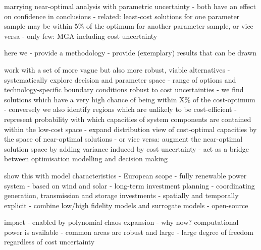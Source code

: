 
marrying near-optimal analysis with parametric uncertainty
- both have an effect on confidence in conclusions
- related: least-cost solutions for one parameter sample may be within 5\% of the optimum for another parameter sample, or vice versa
- only few: MGA including cost uncertainty \cite{Trutnevyte2013,Li2017,lombardi_policy_2020}


here we
- provide a methodology
- provide (exemplary) results that can be drawn

work with a set of more vague but also more robust, viable alternatives
- systematically explore decision and parameter space
- range of options and technology-specific boundary conditions robust to cost uncertainties
- we find solutions which have a very high chance of being within X\% of the cost-optimum
- conversely we also identify regions which are unlikely to be cost-efficient
- represent probability with which capacities of system components are contained within the low-cost space
- expand distribution view of cost-optimal capacities by the space of near-optimal solutions
- or vice versa: augment the near-optimal solution space by adding variance induced by cost uncertainty
- act as a bridge between optimisation modelling and decision making

show this with model characteristics
- European scope
- fully renewable power system
- based on wind and solar
- long-term investment planning
- coordinating generation, transmission and storage investments
- spatially and temporally explicit
- combine low/high fidelity models and surrogate models
- open-source

impact
- enabled by polynomial chaos expansion
- why now? computational power is available
- common areas are robust and large
- large degree of freedom regardless of cost uncertainty